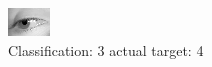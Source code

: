 \begin{figure}[h!]
\begin{center}
\includegraphics[width=0.60\columnwidth]{figures/ID2948_class_3_target_4.png}
\end{center}
\caption{ Classification: 3 actual target: 4}
\label{fig:ID2948_class_3_target_4}
\end{figure}
